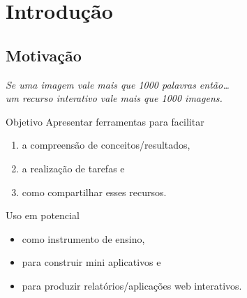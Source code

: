 \section{Introdução}

\subsection{Motivação}

\begin{frame}

  \begin{minipage}[c]{0.8\linewidth}
    \begin{center}
      \it Se uma imagem vale mais que 1000 palavras então\ldots
      \pause~\\
      um recurso interativo vale mais que 1000 imagens.
    \end{center}
  \end{minipage}
  \vspace{2em}

  \begin{multicols}{2}
    \pause
    \begin{block}{Objetivo}
      Apresentar ferramentas para facilitar
      \begin{enumerate}
        \itemsep-2pt\parskip0pt
      \item a compreensão de conceitos/resultados,
      \item a realização de tarefas e
      \item como compartilhar esses recursos.
      \end{enumerate}
    \end{block}
    \vfill
    \columnbreak
    \pause
    \begin{block}{Uso em potencial}
      \begin{itemize}
      \item como instrumento de ensino,
      \item para construir mini aplicativos e
      \item para produzir relatórios/aplicações web interativos.
      \end{itemize}
    \end{block}
  \end{multicols}
\end{frame}

